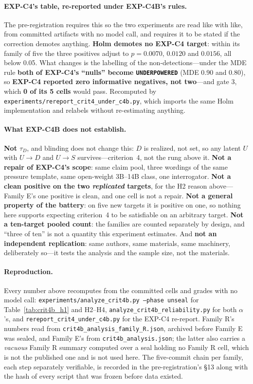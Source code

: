 \paragraph{EXP-C4's table, re-reported under EXP-C4B's rules.} The pre-registration requires this so the two experiments are read like with like, from committed artifacts with no model call, and requires it to be stated if the correction demotes anything. \textbf{Holm demotes no EXP-C4 target}: within its family of five the three positives adjust to $p\!=\!0.0070$, $0.0120$ and $0.0156$, all below 0.05. What changes is the labelling of the non-detections---under the MDE rule \textbf{both of EXP-C4's ``nulls'' become \texttt{UNDERPOWERED}} (MDE 0.90 and 0.80), so \textbf{EXP-C4 reported zero informative negatives, not two}---and gate 3, which \textbf{0 of its 5 cells} would pass. Recomputed by \texttt{experiments/rereport\_crit4\_under\_c4b.py}, which imports the same Holm implementation and relabels without re-estimating anything.

\paragraph{What EXP-C4B does not establish.} \textbf{Not $\tau_D$}, and blinding does not change this: $D$ is realized, not set, so any latent $U$ with $U\!\to\!D$ and $U\!\to\!S$ survives---criterion~4, not the rung above it. \textbf{Not a repair of EXP-C4's scope}: same claim pool, three wordings of the same pressure template, same open-weight 3B--14B class, one interrogator. \textbf{Not a clean positive on the two \emph{replicated} targets}, for the H2 reason above---Family E's one positive is clean, and one cell is not a repair. \textbf{Not a general property of the battery}: on five new targets it is positive on one, so nothing here supports expecting criterion~4 to be satisfiable on an arbitrary target. \textbf{Not a ten-target pooled count}: the families are counted separately by design, and ``three of ten'' is not a quantity this experiment estimates. And \textbf{not an independent replication}: same authors, same materials, same machinery, deliberately so---it tests the analysis and the sample size, not the materials.

\paragraph{Reproduction.} Every number above recomputes from the committed cells and grades with no model call: \texttt{experiments/analyze\_crit4b.py --phase unseal} for Table~\ref{tab:crit4b_h1} and H2--H4, \texttt{analyze\_crit4b\_reliability.py} for both $\alpha$'s, and \texttt{rereport\_crit4\_under\_c4b.py} for the EXP-C4 re-report. Family R's numbers read from \texttt{crit4b\_analysis\_family\_R.json}, archived before Family E was sealed, and Family E's from \texttt{crit4b\_analysis.json}; the latter also carries a \emph{vacuous} Family R summary computed over a seal holding no Family R cell, which is not the published one and is not used here. The five-commit chain per family, each step separately verifiable, is recorded in the pre-registration's §13 along with the hash of every script that was frozen before data existed.

